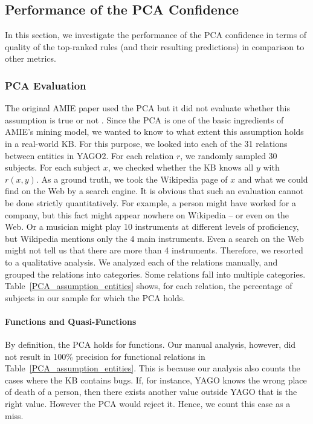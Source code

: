 \subsection{Performance of the PCA Confidence} \label{exp_std_vs_pca}
In this section, we investigate the performance of the PCA confidence
in terms of quality of the top-ranked rules (and their resulting predictions) in comparison to
other metrics.

\subsubsection{PCA Evaluation}\label{pcaEvaluation}
The original AMIE paper used the PCA but it did not evaluate whether this assumption is true or not \cite{amie}.
Since the PCA is one of the basic ingredients of AMIE's mining model,
we wanted to know to what extent this assumption holds in a real-world KB.
For this purpose, we looked into each of the 31 relations between entities in YAGO2.
For each relation $r$, we randomly sampled 30 subjects.
For each subject $x$, we checked whether the KB knows all $y$ with $r(x,y)$.
As a ground truth, we took the Wikipedia page of $x$ and what we could find on the Web by a search engine.
It is obvious that such an evaluation cannot be done strictly quantitatively.
For example, a person might have worked for a company, but this fact might appear nowhere on Wikipedia -- or even on the Web.
Or a musician might play 10 instruments at different levels of proficiency, but Wikipedia mentions only the 4 main instruments.
Even a search on the Web might not tell us that there are more than 4 instruments.
Therefore, we resorted to a qualitative analysis.
We analyzed each of the relations manually, and grouped the relations into categories.
Some relations fall into multiple categories.
Table~\ref{PCA_assumption_entities} shows, for each relation, the percentage of subjects in our sample for which the PCA holds.

\paragraph{Functions and Quasi-Functions} By definition, the PCA holds for functions. Our manual analysis, however, did not result in 100\% precision for functional relations in Table~\ref{PCA_assumption_entities}.
This is because our analysis also counts the cases where the KB contains bugs. If, for instance, YAGO knows the wrong place of death of a person, then there exists another value outside YAGO that is the right value. However the PCA would reject it. Hence, we count this case as a miss.

